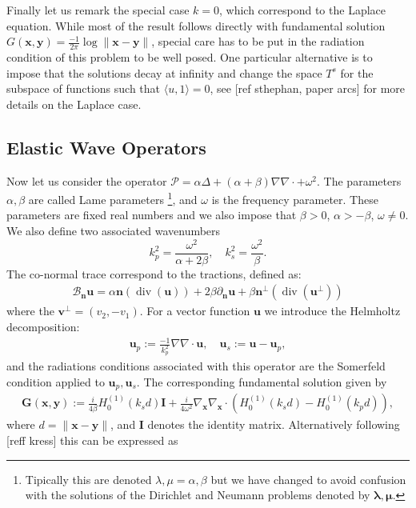 \documentclass{article}
\renewcommand{\div}{\operatorname{div}}
\newcommand{\todo}[1]{{\color{red}[#1]}}
\newcommand{\bmu} {\bm{\mu}}
\renewcommand{\div}{{\rm div}}
\renewcommand{\div}{\operatorname{div}}
\newcommand{\cP}{\mathcal{P}}
\newcommand{\bla}{\boldsymbol \lambda}
\newcommand{\bn}{\bm{n}}
\newcommand{\bu}{\bm{u}}
\newcommand{\bx}{\bm{x}}
\newcommand{\by}{\bm{y}}
\begin{document}
Finally let us remark the special case $k=0$, which correspond to the Laplace equation. While most of the result follows directly with fundamental solution $G(\bx,\by) = \frac{-1}{2\pi} \log \| \bx - \by \|$, special care has to be put in the radiation condition of this problem to be well posed. One particular alternative is to impose that the solutions decay at infinity and change the space $T^s$ for the subspace of functions such that $\langle u, 1 \rangle = 0$, see \todo{ref sthephan, paper arcs} for more details on the Laplace case. 
\subsection{Elastic Wave Operators}

Now let us consider the operator $\cP = \alpha \Delta + (\alpha + \beta) \nabla \nabla \cdot + \omega^2$. The parameters $\alpha,\beta$ are called Lame parameters \footnote{Tipically this are denoted $\lambda, \mu = \alpha, \beta$ but we have changed to avoid confusion with the solutions of the Dirichlet and Neumann problems denoted by $\bla, \bmu$.}, and $\omega$ is the frequency parameter. These parameters are  fixed real numbers and we also impose that  $\beta > 0$, $\alpha > - \beta$, $\omega \neq 0$. We also define two associated wavenumbers $$
k_p^2 = \frac{\omega^2}{\alpha+2\beta}, \quad
k_s^2 = \frac{\omega^2}{\beta}.$$  
The co-normal trace correspond to the tractions, defined as: 
\begin{align*}
\mathcal{B}_{\bn} \mathbf{u} =
\alpha \mathbf{n} (\div(\mathbf{u}))
+ 2 \beta \partial_{\mathbf{n}} \mathbf{u}+
\beta  \mathbf{n}^\perp (\div(\mathbf{u}^\perp))
\end{align*}
where the $\mathbf{v}^\perp  = (v_2,-v_1)$. For a vector function $\bu$ we introduce the Helmholtz decomposition: 
\begin{align*}
\mathbf{u}_p := \frac{-1}{k^2_p}\nabla \nabla \cdot \mathbf{u}, \quad
\mathbf{u}_s := \mathbf{u} - \mathbf{u}_p,
\end{align*} 
and the radiations conditions associated with this operator are the Somerfeld condition applied to $\bu_p, \bu_s$. 
The corresponding fundamental solution given by 
\begin{align}
\label{eq:efunsol}
\mathbf{G} (\mathbf{x}, \mathbf{y}) := 
\frac{i}{4 \beta} H^{(1)}_0(k_s d)\mathbf{I}+ \frac{i}{4\omega^2} \nabla_\mathbf{x} 
\nabla_\mathbf{x} \cdot \left( 
H^{(1)}_0(k_sd ) - H^{(1)}_0(k_p d)
\right),
\end{align}
where $d = \| \bx -\by\|$, and $\mathbf{I}$ denotes the identity matrix. Alternatively following \todo{reff kress} this can be expressed as 
\end{document}
